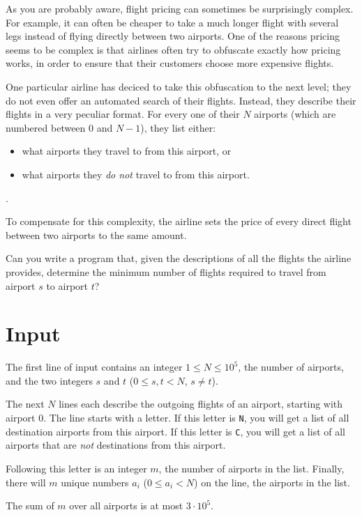 As you are probably aware, flight pricing can sometimes be surprisingly complex.
For example, it can often be cheaper to take a much longer flight with several legs instead of flying directly between two airports.
One of the reasons pricing seems to be complex is that airlines often try to obfuscate exactly how pricing works, in order to ensure that their customers choose more expensive flights.

One particular airline has deciced to take this obfuscation to the next level; they do not even offer an automated search of their flights.
Instead, they describe their flights in a very peculiar format.
For every one of their $N$ airports (which are numbered between $0$ and $N - 1$), they list either:
\begin{itemize}
    \item what airports they travel to from this airport, or
    \item what airports they \emph{do not} travel to from this airport.
\end{itemize}.

To compensate for this complexity, the airline sets the price of every direct flight between two airports to the same amount.

Can you write a program that, given the descriptions of all the flights the airline provides, determine the minimum number of flights required to travel from airport $s$ to airport $t$?

\section*{Input}
The first line of input contains an integer $1 \le N \le 10^5$, the number of airports, and the two integers $s$ and $t$ ($0 \le s, t < N$, $s \neq t$).

The next $N$ lines each describe the outgoing flights of an airport, starting with airport $0$.
The line starts with a letter.
If this letter is \texttt{N}, you will get a list of all destination airports from this airport.
If this letter is \texttt{C}, you will get a list of all airports that are \emph{not} destinations from this airport.

Following this letter is an integer $m$, the number of airports in the list.
Finally, there will $m$ unique numbers $a_i$ ($0 \le a_i < N$) on the line, the airports in the list.

The sum of $m$ over all airports is at most $3 \cdot 10^5$.

